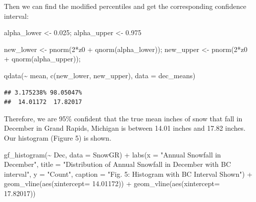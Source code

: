 \documentclass[12pt]{article}
\newenvironment{Shaded}{\begin{snugshade}}{\end{snugshade}}
\newcommand{\AttributeTok}[1]{\textcolor[rgb]{0.77,0.63,0.00}{#1}}
\newcommand{\DecValTok}[1]{\textcolor[rgb]{0.00,0.00,0.81}{#1}}
\newcommand{\FloatTok}[1]{\textcolor[rgb]{0.00,0.00,0.81}{#1}}
\newcommand{\FunctionTok}[1]{\textcolor[rgb]{0.00,0.00,0.00}{#1}}
\newcommand{\NormalTok}[1]{#1}
\newcommand{\OtherTok}[1]{\textcolor[rgb]{0.56,0.35,0.01}{#1}}
\newcommand{\SpecialCharTok}[1]{\textcolor[rgb]{0.00,0.00,0.00}{#1}}
\newcommand{\StringTok}[1]{\textcolor[rgb]{0.31,0.60,0.02}{#1}}
\begin{document}
Then we can find the modified percentiles and get the corresponding
confidence interval:

\begin{Shaded}
\begin{Highlighting}[]
\NormalTok{alpha\_lower }\OtherTok{\textless{}{-}} \FloatTok{0.025}\NormalTok{; alpha\_upper }\OtherTok{\textless{}{-}} \FloatTok{0.975}

\NormalTok{new\_lower }\OtherTok{\textless{}{-}} \FunctionTok{pnorm}\NormalTok{(}\DecValTok{2}\SpecialCharTok{*}\NormalTok{z0 }\SpecialCharTok{+} \FunctionTok{qnorm}\NormalTok{(alpha\_lower)); }
\NormalTok{new\_upper }\OtherTok{\textless{}{-}} \FunctionTok{pnorm}\NormalTok{(}\DecValTok{2}\SpecialCharTok{*}\NormalTok{z0 }\SpecialCharTok{+} \FunctionTok{qnorm}\NormalTok{(alpha\_upper)); }

\FunctionTok{qdata}\NormalTok{(}\SpecialCharTok{\textasciitilde{}}\NormalTok{ mean, }\FunctionTok{c}\NormalTok{(new\_lower, new\_upper), }\AttributeTok{data =}\NormalTok{ dec\_means)}
\end{Highlighting}
\end{Shaded}

\begin{verbatim}
## 3.175238% 98.05047% 
##  14.01172  17.82017
\end{verbatim}

Therefore, we are 95\% confident that the true mean inches of snow that
fall in December in Grand Rapids, Michigan is between 14.01 inches and
17.82 inches. Our histogram (Figure 5) is shown.

\begin{Shaded}
\begin{Highlighting}[]
\FunctionTok{gf\_histogram}\NormalTok{(}\SpecialCharTok{\textasciitilde{}}\NormalTok{ Dec, }\AttributeTok{data =}\NormalTok{ SnowGR) }\SpecialCharTok{+}
  \FunctionTok{labs}\NormalTok{(}\AttributeTok{x =} \StringTok{"Annual Snowfall in December"}\NormalTok{, }
       \AttributeTok{title =} \StringTok{"Distribution of Annual Snowfall in December}
\StringTok{       with BC interval"}\NormalTok{, }\AttributeTok{y =} \StringTok{"Count"}\NormalTok{,}
       \AttributeTok{caption =} \StringTok{"Fig. 5: Histogram with BC Interval Shown"}\NormalTok{) }\SpecialCharTok{+}
  \FunctionTok{geom\_vline}\NormalTok{(}\FunctionTok{aes}\NormalTok{(}\AttributeTok{xintercept=} \FloatTok{14.01172}\NormalTok{)) }\SpecialCharTok{+}
  \FunctionTok{geom\_vline}\NormalTok{(}\FunctionTok{aes}\NormalTok{(}\AttributeTok{xintercept=} \FloatTok{17.82017}\NormalTok{))}
\end{Highlighting}
\end{Shaded}
\end{document}
